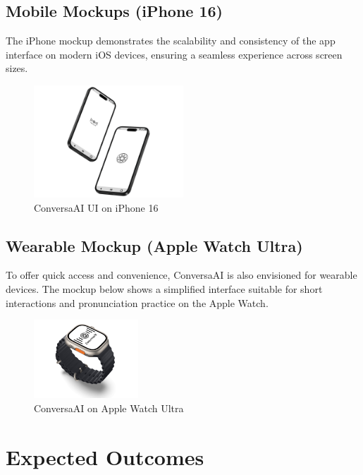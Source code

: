\documentclass[12pt]{article}
\begin{document}
\newpage

\subsection*{Mobile Mockups (iPhone 16)}

The iPhone mockup demonstrates the scalability and consistency of the app interface on modern iOS devices, ensuring a seamless experience across screen sizes.

\begin{figure}[h!]
    \centering
    \includegraphics[width=0.5\textwidth]{iPhone_16.png} %
    \caption{ConversaAI UI on iPhone 16}
    \label{fig:iphone_ui}
\end{figure}

\subsection*{Wearable Mockup (Apple Watch Ultra)}

To offer quick access and convenience, ConversaAI is also envisioned for wearable devices. The mockup below shows a simplified interface suitable for short interactions and pronunciation practice on the Apple Watch.

\begin{figure}[h!]
    \centering
    \includegraphics[width=0.35\textwidth]{Apple_Watch_Ultra.png} %
    \caption{ConversaAI on Apple Watch Ultra}
    \label{fig:watch_ui}
\end{figure}


\section*{Expected Outcomes}
\end{document}
